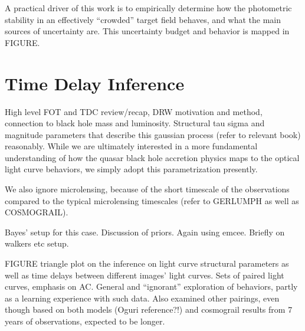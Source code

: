 \documentclass[iop]{emulateapj}
\makeatletter
\newenvironment{inlinefigure}{
\def\@captype{figure}
\noindent\begin{minipage}{0.999\linewidth}\begin{center}}
{\end{center}\end{minipage}\smallskip}
\makeatother
\begin{document}
A practical driver of this work is to empirically determine how the
photometric stability in an effectively ``crowded'' target field
behaves, and what the main sources of uncertainty are.  This
uncertainty budget and behavior is mapped in FIGURE.  
\begin{inlinefigure}
\begin{center}
\end{center}
\end{inlinefigure}

\section{Time Delay Inference}

High level FOT and TDC review/recap, DRW motivation and method,
connection to black hole mass and luminosity. Structural tau sigma and
magnitude parameters that describe this gaussian process (refer to
relevant book) reasonably.  While we are ultimately interested in a
more fundamental understanding of how the quasar black hole accretion
physics maps to the optical light curve behaviors, we simply adopt
this parametrization presently.  

We also ignore microlensing, because of the short timescale of the
observations compared to the typical microlensing timescales (refer to
GERLUMPH as well as COSMOGRAIL).  

Bayes' setup for this case. Discussion of priors. Again using
emcee. Briefly on walkers etc setup.  

FIGURE triangle plot on the inference on light curve structural
parameters as well as time delays between different images' light
curves.  Sets of paired light curves, emphasis on AC.  General and
``ignorant'' exploration of behaviors, partly as a learning experience
with such data.  Also examined other pairings, even though based on
both models (Oguri reference?!) and cosmograil results from 7 years of
observations, expected to be longer.  
\end{document}
